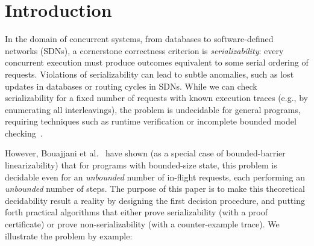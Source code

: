 \section{Introduction}
\label{sec:introduction}

In the domain of concurrent systems, from databases to software-defined networks (SDNs), a cornerstone correctness criterion is \emph{serializability}: every concurrent execution must produce outcomes equivalent to some serial ordering of requests. Violations of serializability can lead to subtle anomalies, such as lost updates in databases or routing cycles in SDNs.
While we can check serializability for a fixed number of requests with known execution traces (e.g., by enumerating all interleavings), the problem is undecidable for general programs, requiring techniques such as runtime verification or incomplete bounded model checking~\cite{WaSt06a,WaSt06b,FlFrYi08,FaMa08,SiMaWaGu11a,SiMaWaGu11b,Pa79,AlMcPe96,BiEn19}.

However, Bouajjani et al.~\cite{BoEmEnHa13} have shown (as a special case of bounded-barrier linearizability) that for programs with bounded-size state, this problem is decidable even for an \emph{unbounded} number of in-flight requests, each performing an \emph{unbounded} number of steps. The purpose of this paper is to make this theoretical decidability result a reality by designing the first decision procedure, and putting forth practical algorithms that either prove serializability (with a proof certificate) or prove non-serializability (with a counter-example trace).
% 
We illustrate the problem by example:


